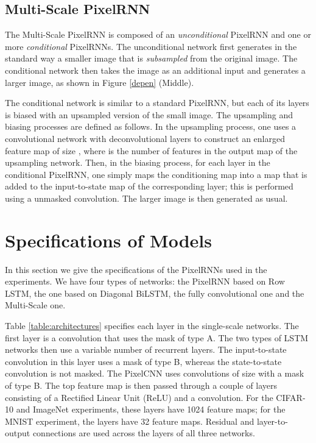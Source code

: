 \documentclass{article}
\begin{document}
\subsection{Multi-Scale PixelRNN}
\label{sect:multiscale}

The Multi-Scale PixelRNN is composed of an \emph{unconditional} PixelRNN and one or more \emph{conditional} PixelRNNs. The unconditional network first generates in the standard way a smaller  image that is \emph{subsampled} from the original image. The conditional network then takes the  image as an additional input and generates a larger  image, as shown in Figure \ref{depen} (Middle).

The conditional network is similar to a standard PixelRNN, but each of its layers is biased with an upsampled version of the small  image. The upsampling and biasing processes are defined as follows. In the upsampling process, one uses a convolutional network with deconvolutional layers to construct an enlarged feature map of size , where  is the number of features in the output map of the upsampling network. Then, in the biasing process, for each layer in the conditional PixelRNN, one simply maps the  conditioning map into a  map that is added to the input-to-state map of the corresponding layer; this is performed using a  unmasked convolution. The larger  image is then generated as usual.


\section{Specifications of Models}

In this section we give the specifications of the PixelRNNs used in the experiments. We have four types of networks: the PixelRNN based on Row LSTM, the one based on Diagonal BiLSTM, the fully convolutional one and the Multi-Scale one. 

Table \ref{table:architectures} specifies each layer in the single-scale networks. The first layer is a  convolution that uses the mask of type A. The two types of LSTM networks then use a variable number of recurrent layers. The input-to-state convolution in this layer uses a mask of type B, whereas the state-to-state convolution is not masked. The PixelCNN uses convolutions of size  with a mask of type B. The top feature map is then passed through a couple of layers consisting of a Rectified Linear Unit (ReLU) and a  convolution. For the CIFAR-10 and ImageNet experiments, these layers have 1024 feature maps; for the MNIST experiment, the layers have 32 feature maps. Residual and layer-to-output connections are used across the layers of all three networks.
\end{document}
